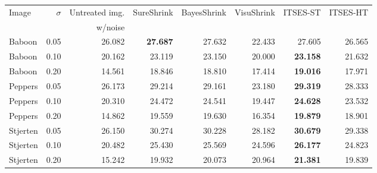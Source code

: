 \begin{tabular}{l|r|rrrrrr}
	\toprule
	Image &  $\sigma$ &  Untreated img.  &      SureShrink &   BayesShrink &    VisuShrink &  ITSES-ST &  ITSES-HT \\
	&&w/noise&&&&&\\
	\midrule
	Baboon &      0.05 & 26.082 & \textbf{27.687} & 27.632 & 22.433 &    27.605 &    26.565 \\
	Baboon &      0.10 & 20.162 & 23.119 & 23.150 & 20.000 &    \textbf{23.158} &    21.632 \\
	Baboon &      0.20 & 14.561 & 18.846 & 18.810 & 17.414 &    \textbf{19.016} &    17.971 \\
	Peppers &      0.05 & 26.173 & 29.214 & 29.161 & 23.180 &    \textbf{29.319} &    28.333 \\
	Peppers &      0.10 & 20.310 & 24.472 & 24.541 & 19.447 &    \textbf{24.628} &    23.532 \\
	Peppers &      0.20 & 14.862 & 19.559 & 19.630 & 16.354 &    \textbf{19.879} &    18.901 \\
	Stjerten &      0.05 & 26.150 & 30.274 & 30.228 & 28.182 &    \textbf{30.679} &    29.338 \\
	Stjerten &      0.10 & 20.482 & 25.430 & 25.569 & 24.596 &    \textbf{26.177} &    24.823 \\
	Stjerten &      0.20 & 15.242 & 19.932 & 20.073 & 20.964 &    \textbf{21.381} &    19.839 \\
	\bottomrule
\end{tabular}